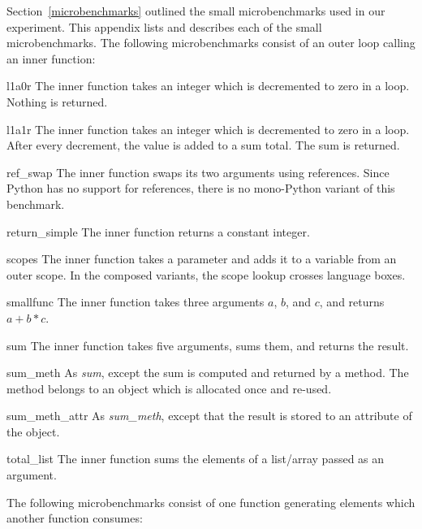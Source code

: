 \documentclass[a4paper,UKenglish]{lipics-v2016}
\begin{document}
Section~\ref{microbenchmarks} outlined the small microbenchmarks used in our experiment.
This appendix lists and describes each of the small microbenchmarks. The following
microbenchmarks consist of an outer loop calling an inner function:
\begin{description*}
\item[l1a0r] The inner function takes an integer which is decremented to
    zero in a loop. Nothing is returned.
\item[l1a1r] The inner function takes an integer which is decremented to
zero in a loop. After every decrement, the value is added to a sum total. The sum is returned.
\item[ref\_swap] The inner function swaps its two
    arguments using references. Since Python has no
    support for references, there is no mono-Python variant of this benchmark.
\item[return\_simple] The inner function returns a constant integer.
\item[scopes] The inner function takes a parameter and adds it to a variable
    from an outer scope. In the composed variants,
    the scope lookup crosses language boxes.
\item[smallfunc] The inner function takes three arguments $a$, $b$, and
    $c$, and returns $a + b * c$.
\item[sum] The inner function takes five arguments, sums them, and returns the result.
\item[sum\_meth] As \emph{sum}, except the sum is computed and returned by a method. The method belongs
to an object which is allocated once and re-used.
\item[sum\_meth\_attr] As \emph{sum\_meth}, except that the result is stored to an attribute of the object.
\item[total\_list] The inner function sums the elements of a list/array passed as an argument.
\end{description*}
The following microbenchmarks consist of one function generating
elements which another function consumes:
\end{document}
